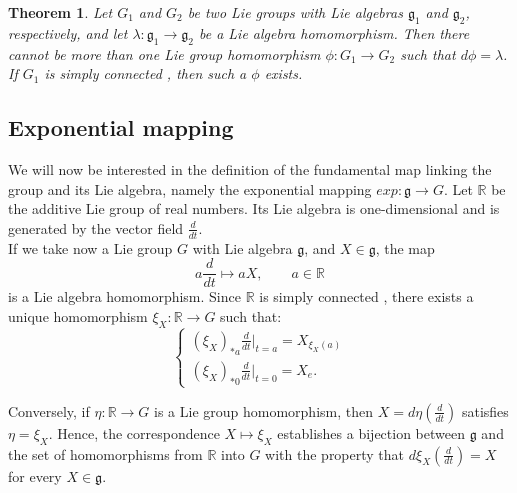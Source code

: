 \documentclass[a4paper,11pt]{article} %
\numberwithin{equation}{section} %
\numberwithin{figure}{section} %
\newtheorem{thm}{Theorem}
\begin{document}
\begin{thm} 
Let $G_1$ and $G_2$ be two  Lie groups with Lie algebras $\mathfrak{g}_1$ and $\mathfrak{g}_2$, respectively, and let $\lambda:\mathfrak{g}_1\rightarrow\mathfrak{g}_2$ be a Lie algebra homomorphism. Then there cannot be more than one Lie group homomorphism $\phi:G_1\to G_2$ such that $d\phi=\lambda$. If $G_1$ is simply connected \cite[Rem. p. 63]{Yvette2005}, then such a $\phi$ exists.
\end{thm}

\subsection{Exponential mapping}

We will now be interested in the definition of the fundamental map linking the group and its Lie algebra, namely the exponential mapping $exp:\mathfrak{g}\rightarrow G$. Let $\mathbb{R}$ be the additive Lie group of real numbers. Its Lie algebra is one-dimensional and is generated by the vector field $\frac{d}{dt}$. \\ 
If we take now a Lie group $G$ with Lie algebra $\mathfrak{g}$, and $X\in\mathfrak{g}$, the map 
\begin{equation}
a\frac{d}{dt}\mapsto a X,\qquad a\in\mathbb{R}
\end{equation}
is a Lie algebra homomorphism. Since $\mathbb{R}$ is simply connected \cite[Def. 1.28, p. 16]{Moretti2012}, there exists a unique homomorphism $\xi_X:\mathbb{R}\rightarrow G$ such that:
\begin{equation}
\begin{cases}
(\xi_X)_{*a}\frac{d}{dt}\Bigr|_{t=a}=X_{\xi_X(a)}\\
(\xi_X)_{*0}\frac{d}{dt}\Bigr|_{t=0}=X_{e}.
\end{cases}
\end{equation}

Conversely, if $\eta:\mathbb{R}\rightarrow G$ is a Lie group homomorphism, then $X=d\eta(\frac{d}{dt})$ satisfies $\eta=\xi_X$. Hence, the correspondence $X\mapsto\xi_X$ establishes a bijection between $\mathfrak{g}$ and the set of homomorphisms from  $\mathbb{R}$ into $G$ with the property that $d\xi_X(\frac{d}{dt})=X$ for every $X\in\mathfrak{g}$.\\
\end{document}
